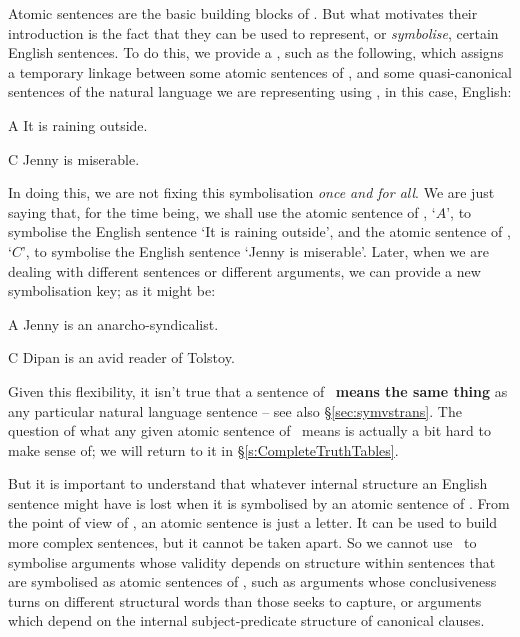 Atomic sentences are the basic building blocks of \TFL. But what motivates their introduction is the fact that they can be used to represent, or \emph{symbolise}, certain English sentences. To do this, we provide a , such as the following, which assigns a temporary linkage between some atomic sentences of \TFL, and some quasi-canonical sentences of the natural language we are representing using \TFL, in this case, English:
	\begin{ekey}
		\item[A] It is raining outside.
		\item[C] Jenny is miserable.
	\end{ekey}
In doing this, we are not fixing this symbolisation \emph{once and for all}. We are just saying that, for the time being, we shall use the atomic sentence of \TFL, `$A$', to symbolise the English sentence `It is raining outside', and the atomic sentence of \TFL, `$C$', to symbolise the English sentence `Jenny is miserable'. Later, when we are dealing with different sentences or different arguments, we can provide a new symbolisation key; as it might be:
	\begin{ekey}
		\item[A] Jenny is an anarcho-syndicalist.
		\item[C] Dipan is an avid reader of Tolstoy.
	\end{ekey}
Given this flexibility, it isn't true that a sentence of \TFL\ \textbf{means the same thing} as any particular natural language sentence – see also §\ref{sec:symvstrans}. The question of what any given atomic sentence of \TFL\ means is actually a bit hard to make sense of; we will return to it in §\ref{s:CompleteTruthTables}.


But it is important to understand that whatever internal structure an English sentence might have is lost when it is symbolised by an atomic sentence of \TFL. From the point of view of \TFL, an atomic sentence is just a letter. It can be used to build more complex sentences, but it cannot be taken apart. So we cannot use \TFL\ to symbolise arguments whose validity depends on structure within sentences that are symbolised as atomic sentences of \TFL, such as arguments whose conclusiveness turns on different structural words than those \TFL seeks to capture, or arguments which depend on the internal subject-predicate structure of canonical clauses.





